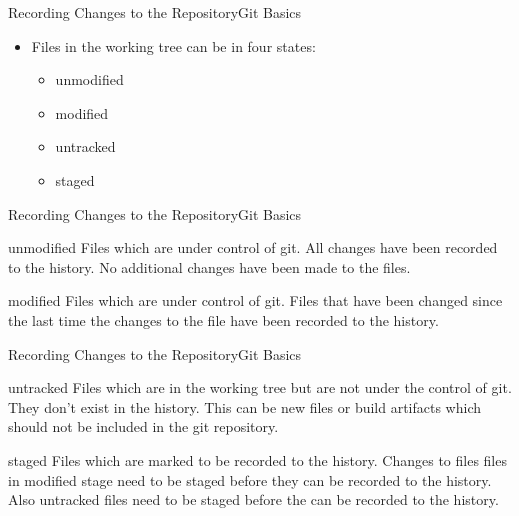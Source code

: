 \documentclass[aspectratio=169]{beamer}
\begin{document}
\begin{frame}[fragile]{Recording Changes to the Repository}{Git Basics}
\begin{itemize}
    \item Files in the working tree can be in four states:
    \begin{itemize}
        \item unmodified
        \item modified
        \item untracked
        \item staged
    \end{itemize}
\end{itemize}
\end{frame}

\begin{frame}{Recording Changes to the Repository}{Git Basics}
\begin{block}{unmodified}
    Files which are under control of git. All changes have been recorded to the
    history. No additional changes have been made to the files.
\end{block}
\begin{block}{modified}
    Files which are under control of git. Files that have been changed since
    the last time the changes to the file have been recorded to the history.
\end{block}
\end{frame}


\begin{frame}{Recording Changes to the Repository}{Git Basics}
\begin{block}{untracked}
	Files which are in the working tree but are not under the control of git.
	They don't exist in the history. This can be new files or build artifacts
	which should not be included in the git repository.
\end{block}
\begin{block}{staged}
	Files which are marked to be recorded to the history. Changes to files files
	in modified stage need to be staged before they can be recorded to the
	history. Also untracked files need to be staged before the can be recorded to
	the history.
\end{block}
\end{frame}
\end{document}
